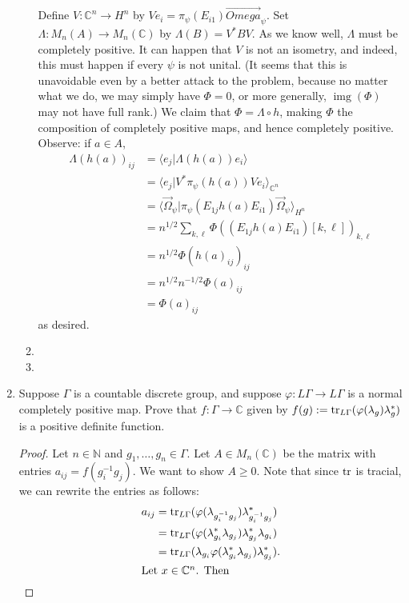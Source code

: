 \documentclass[a4paper,10pt]{report}
\newcommand{\ggen}[1]{\langle#1\rangle}
\newcommand{\N}{\mathbb{N}}
\newcommand{\C}{\mathbb{C}}
\DeclareMathOperator{\img}{img}
\begin{document}
\begin{enumerate}
\begin{enumerate}
				Define $V:\C^n\to H^n$ by $Ve_i=\pi_\psi(E_{i1})\vec{Omega}_\psi$. Set $\Lambda:M_n(A)\to M_n(\C)$ by $\Lambda(B)=V^*BV$. As we know well, $\Lambda$ must be completely positive. It can happen that $V$ is not an isometry, and indeed, this must happen if every $\psi$ is not unital. 
				(It seems that this is unavoidable even by a better attack to the problem, because no matter what we do, we may simply have $\Phi=0$, or more generally, $\img(\Phi)$ may not have full rank.) 
				We claim that $\Phi=\Lambda\circ h$, making $\Phi$ the composition of completely positive maps, and hence completely positive. Observe: if $a\in A$, 
				\begin{align*}
					\Lambda(h(a))_{ij} &= \ggen{e_j|\Lambda(h(a))e_i}\\
					&= \ggen{e_j|V^*\pi_\psi(h(a))Ve_i}_{\C^n}\\
					&= \ggen{\vec{\Omega}_\psi|\pi_\psi(E_{1j}h(a)E_{i1})\vec{\Omega}_\psi}_{H^n}\\
					&= n^{1/2}\sum_{k,\ell}\Phi((E_{1j}h(a)E_{i1})[k,\ell])_{k,\ell}\\
					&= n^{1/2}\Phi(h(a)_{ij})_{ij}\\
					&= n^{1/2}n^{-1/2}\Phi(a)_{ij}\\
					&= \Phi(a)_{ij}
				\end{align*}
				as desired. 
			\item 
			\item 
		\end{enumerate}
	\item	Suppose $\Gamma$ is a countable discrete group,
		and suppose $\varphi : L\Gamma \to L\Gamma$ is a normal completely positive map.
		Prove that $f : \Gamma \to \C$ given by $f(g) := \operatorname{tr}_{L\Gamma}(\varphi(\lambda_g)\lambda_g^*)$
		is a positive definite function.
		\begin{proof}
			Let $n \in \N$ and $g_1, \dots, g_n \in \Gamma$.
			Let $A \in M_n(\C)$ be the matrix with entries $a_{ij} = f(g_i^{-1}g_j)$.
			We want to show $A \ge 0$.
			Note that since $\operatorname{tr}$ is tracial, we can rewrite the entries as follows:
			\begin{align*}
				a_{ij} & = \tr_{L\Gamma}(\varphi(\lambda_{g_i^{-1}g_j})\lambda_{g_i^{-1}g_j}^*) \\
				 & = \tr_{L\Gamma}(\varphi(\lambda_{g_i}^* \lambda_{g_j})
				 \lambda_{g_j}^*\lambda_{g_i}) \\
				 & = \tr_{L\Gamma}(\lambda_{g_i}\varphi(\lambda_{g_i}^* \lambda_{g_j})
				 \lambda_{g_j}^*). \\
			\intertext{Let $x \in \C^n$. Then}

\end{align*}
\end{proof}
\end{enumerate}
\end{document}
